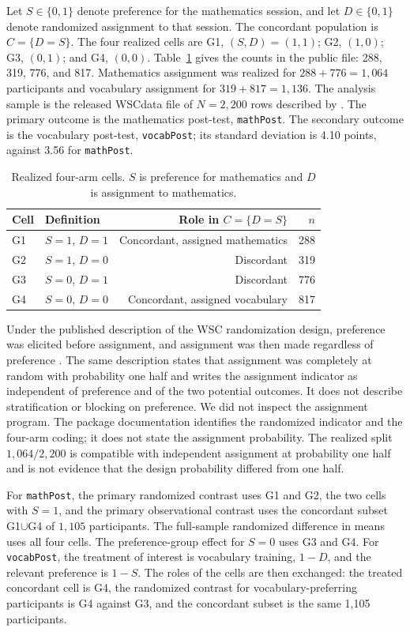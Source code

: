 \documentclass[twoside,11pt]{article}
\begin{document}
Let $S\in\{0,1\}$ denote preference for the mathematics session, and let $D\in\{0,1\}$ denote randomized assignment to that session. The concordant population is $C=\{D=S\}$. The four realized cells are G1, $(S,D)=(1,1)$; G2, $(1,0)$; G3, $(0,1)$; and G4, $(0,0)$. Table~\ref{tab:cells} gives the counts in the public file: 288, 319, 776, and 817. Mathematics assignment was realized for $288+776=1{,}064$ participants and vocabulary assignment for $319+817=1{,}136$. The analysis sample is the released WSCdata file of $N=2{,}200$ rows described by \citet{keller2025}. The primary outcome is the mathematics post-test, \texttt{mathPost}. The secondary outcome is the vocabulary post-test, \texttt{vocabPost}; its standard deviation is 4.10 points, against 3.56 for \texttt{mathPost}.

\begin{table}[htbp]
\centering
\caption{Realized four-arm cells. $S$ is preference for mathematics and $D$ is assignment to mathematics.}
\label{tab:cells}
\begin{tabular}{llrr}
\toprule
Cell & Definition & Role in $C=\{D=S\}$ & $n$ \\
\midrule
G1 & $S=1$, $D=1$ & Concordant, assigned mathematics & 288 \\
G2 & $S=1$, $D=0$ & Discordant & 319 \\
G3 & $S=0$, $D=1$ & Discordant & 776 \\
G4 & $S=0$, $D=0$ & Concordant, assigned vocabulary & 817 \\
\bottomrule
\end{tabular}
\end{table}

Under the published description of the WSC randomization design, preference was elicited before assignment, and assignment was then made regardless of preference \citep{keller2025}. The same description states that assignment was completely at random with probability one half and writes the assignment indicator as independent of preference and of the two potential outcomes. It does not describe stratification or blocking on preference. We did not inspect the assignment program. The package documentation identifies the randomized indicator and the four-arm coding; it does not state the assignment probability. The realized split $1{,}064/2{,}200$ is compatible with independent assignment at probability one half and is not evidence that the design probability differed from one half.

For \texttt{mathPost}, the primary randomized contrast uses G1 and G2, the two cells with $S=1$, and the primary observational contrast uses the concordant subset G1$\cup$G4 of $1{,}105$ participants. The full-sample randomized difference in means uses all four cells. The preference-group effect for $S=0$ uses G3 and G4. For \texttt{vocabPost}, the treatment of interest is vocabulary training, $1-D$, and the relevant preference is $1-S$. The roles of the cells are then exchanged: the treated concordant cell is G4, the randomized contrast for vocabulary-preferring participants is G4 against G3, and the concordant subset is the same 1{,}105 participants.
\end{document}
